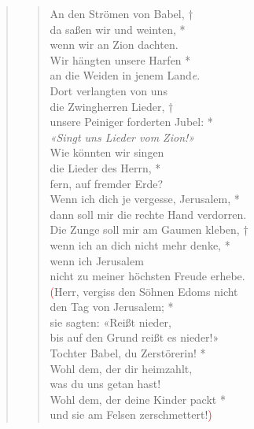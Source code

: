 \begin{quote}
\begin{verse}
An den Strömen von Babel, †\\
da saßen wir und weinten, *\\  
wenn wir an Zion dachten. \\ 
\vin Wir hängten unsere Harfen *\\ 
\vin an die Weiden in jenem Land\textit{e}. \\
Dort verlangten von uns\\
die Zwingherren Lieder, †\\
unsere Peiniger forderten Jubel: *\\  
\textit{«Singt uns Lieder vom Zion!»}\\ 
\vin Wie könnten wir singen\\ 
\vin die Lieder des Herrn, *\\ 
\vin fern, auf fremder Erde?\\
Wenn ich dich je vergesse, Jerusalem, *\\ 
dann soll mir die rechte Hand verdorren.\\ 
\vin Die Zunge soll mir am Gaumen kleben, †\\ 
\vin wenn ich an dich nicht mehr denke, *\\ 
\vin  wenn ich Jerusalem\\ 
\vin nicht zu meiner höchsten Freude erhebe. \\
\textcolor{red}{(}Herr, vergiss den Söhnen Edoms nicht\\
den Tag von Jerusalem; *\\ 
sie sagten: «Reißt nieder,\\
bis auf den Grund reißt es nieder!»\\ 
\vin Tochter Babel, du Zerstörerin! *\\ 
\vin Wohl dem, der dir heimzahlt,\\ 
\vin was du uns getan hast!\\
Wohl dem, der deine Kinder packt *\\ 
und sie am Felsen zerschmettert!\textcolor{red}{)} \\

\end{verse}
\end{quote}

\vspace{0.6cm}

\def\greinitialformat#1{{\fontsize{40}{40}\selectfont #1}}
\gresetfirstlineaboveinitial{\small \textcolor{red}{Ps 138}}{}
\setaboveinitialseparation{0.72mm}

